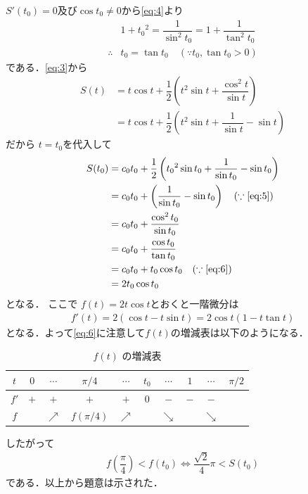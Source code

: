 \documentclass[../../main.tex]{subfiles}
\begin{document}
$S'(t_0) = 0$及び$\cos t_0 \neq 0$から\cref{eq:4}より
\begin{align}
  & 1 + {t_0}^2 = \dfrac{1}{\sin^2 t_0} = 1+\dfrac{1}{\tan^2 t_0} \label{eq:5} \\
  \therefore
  & t_0 = \tan t_0 \quad (\because t_0,\tan t_0 > 0) \label{eq:6}
\end{align}
である．\cref{eq:3}から
\begin{align}
  S(t)
  &= t\cos t + \dfrac{1}{2}\left(t^2\sin t + \dfrac{\cos^2 t}{\sin t}\right) \\
  &= t\cos t + \dfrac{1}{2}\left(t^2\sin t + \dfrac{1}{\sin t} - \sin t \right)
\end{align}
だから $t=t_0$を代入して
\begin{align}
  S(t_0)
  & = c_0 t_0 + \dfrac{1}{2}\left( {t_0}^2\sin t_0  + \dfrac{1}{\sin t_0} - \sin t_0 \right) \\
  & = c_0 t_0 + \left( \dfrac{1}{\sin t_0} - \sin t_0 \right) \quad (\because \text{\cref{eq:5}}) \\
  & = c_0 t_0 + \dfrac{\cos^2 t_0}{\sin t_0} \\
  & = c_0 t_0 + \dfrac{\cos t_0}{\tan t_0} \\
  & = c_0 t_0 + t_0 \cos t_0 \quad (\because\text{\cref{eq:6}})\\
  & = 2t_0\cos t_0 \label{eq:7}
\end{align}
となる．
ここで $f(t) = 2 t \cos t$とおくと一階微分は
\begin{align}
  f'(t) = 2(\cos t - t\sin t) = 2\cos t(1 - t \tan t)
\end{align}
となる．よって\cref{eq:6}に注意して$f(t)$の増減表は以下のようになる．

\begin{table}[htb]
  \centering
  \caption{$f(t)$ の増減表}
  \begin{tabular}{|c|c|c|c|c|c|c|c|c|c|}
    \hline
    $t$ & $0$ & $\cdots$ & $\pi/4$ & $\cdots$ & $t_0$ & $\cdots$ & $1$ & $\cdots$ & $\pi/2$ \\ \hline
    $f'$ & $+$ & $+$ & $+$ & $+$ & $0$ & $-$ & $-$ & $-$ & \\ \hline
    $f$ & & $\nearrow$ & $f(\pi/4)$ & $\nearrow$ & & $\searrow$ & & $\searrow$ & \\ \hline
  \end{tabular}
\end{table}

したがって
\begin{align}
  f(\dfrac{\pi}{4}) < f(t_0) \Leftrightarrow \dfrac{\sqrt{2}}{4}\pi < S(t_0)
\end{align}
である．以上から題意は示された．
\end{document}
